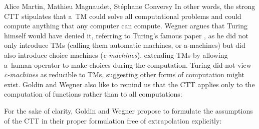 \begin{artengenv2auth}{Alice Martin, Mathieu Magnaudet, Stéphane Conversy}
In other words, the strong CTT stipulates that a~TM could solve all computational problems and could compute anything that any computer can compute. Wegner argues that Turing himself would have denied it, referring to Turing’s famous paper \parencite{Turing1937}, as he did not only introduce TMs (calling them automatic machines, or a-machines) but did also introduce choice machines (\textit{c-machines}), extending TMs by allowing a~human operator to make choices during the computation. Turing did not view \textit{c-machines} as reducible to TMs, suggesting other forms of computation might exist. Goldin and Wegner also like to remind us that the CTT applies only to the computation of functions rather than to all computations: 


For the sake of clarity, Goldin and Wegner propose to formulate the assumptions of the CTT in their proper formulation free of extrapolation \parencite{Goldin2008} explicitly: 



\end{artengenv2auth}
